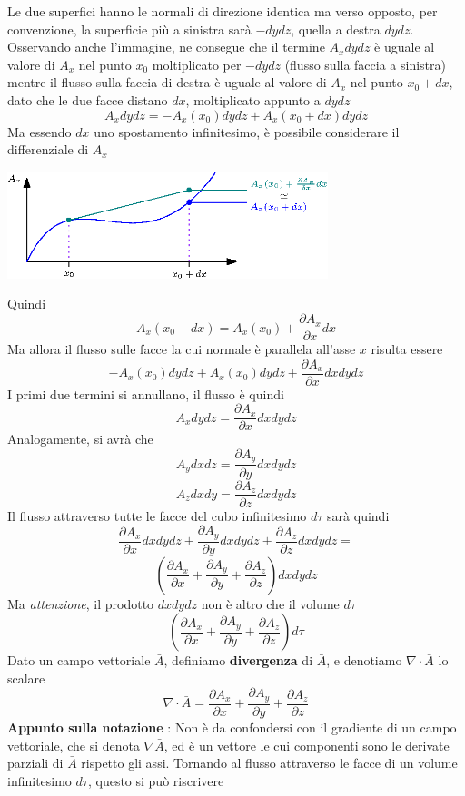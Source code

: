 \documentclass[10pt, letterpaper]{report}
\begin{document}
Le due superfici hanno le normali di direzione identica ma verso opposto, per convenzione, la superficie più a sinistra sarà $-dydz$, quella a destra $dydz$. Osservando anche l'immagine, ne consegue che il termine $A_xdydz$ è uguale al valore di $A_x$ nel punto $x_0$ moltiplicato per $-dydz$ (flusso sulla faccia a sinistra) mentre il flusso sulla faccia di destra è uguale al valore di $A_x$ nel punto $x_0+dx$, dato che le due facce distano $dx$, moltiplicato appunto a $dydz$
$$ A_xdydz=-A_x(x_0)dydz+A_x(x_0+dx)dydz $$
Ma essendo $dx$ uno spostamento infinitesimo, è possibile considerare il differenziale di $A_x$\begin{center}
    \includegraphics[width=0.7\textwidth]{images/Differenziale3.eps}
\end{center}
Quindi 
$$A_x(x_0+dx)=A_x(x_0)+\frac{\partial A_x}{\partial x}dx $$
Ma allora il flusso sulle facce la cui normale è parallela all'asse $x$ risulta essere 
$$ -A_x(x_0)dydz+A_x(x_0)dydz+\frac{\partial A_x}{\partial x}dxdydz$$
I primi due termini si annullano, il flusso è quindi 
$$A_xdydz=\frac{\partial A_x}{\partial x}dxdydz$$
Analogamente, si avrà che 
$$A_ydxdz=\frac{\partial A_y}{\partial y}dxdydz$$
$$A_zdxdy=\frac{\partial A_z}{\partial z}dxdydz$$
Il flusso attraverso tutte le facce del cubo infinitesimo $d\tau$ sarà quindi
$$ \frac{\partial A_x}{\partial x}dxdydz+\frac{\partial A_y}{\partial y}dxdydz+\frac{\partial A_z}{\partial z}dxdydz=$$
$$ (\frac{\partial A_x}{\partial x}+\frac{\partial A_y}{\partial y}+\frac{\partial A_z}{\partial z})dxdydz$$
Ma \textit{attenzione}, il prodotto $dxdydz$ non è altro che il volume $d\tau$
$$ (\frac{\partial A_x}{\partial x}+\frac{\partial A_y}{\partial y}+\frac{\partial A_z}{\partial z})d\tau$$
 Dato un campo vettoriale $\bar A$, definiamo \textbf{divergenza} di $\bar A$, e denotiamo $\nabla \cdot \bar A$ lo scalare 
$$\nabla \cdot \bar A= \frac{\partial A_x}{\partial x}+\frac{\partial A_y}{\partial y}+\frac{\partial A_z}{\partial z}$$
\textbf{Appunto sulla notazione} : Non è da confondersi con il gradiente di un campo vettoriale, che si denota $\nabla \bar A$, ed è un vettore le cui componenti sono le derivate parziali di $\bar A$ rispetto gli assi.\acc 
Tornando al flusso attraverso le facce di un volume infinitesimo $d\tau$, questo si può riscrivere 
\end{document}
